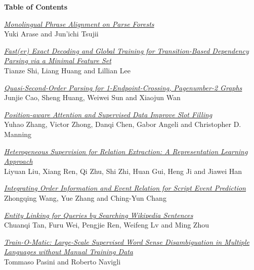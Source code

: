 \setlength{\parindent}{0in}
\setlength{\parskip}{2ex}

\begin{center}
  {\Large \bf Table of Contents}
\end{center}

\vspace*{0.5cm}
\hyperlink{page.1}{\em Monolingual Phrase Alignment on Parse Forests}\samepage \\
\hspace*{7mm} Yuki Arase and Jun'ichi Tsujii\dotfill {}

\hyperlink{page.12}{\em Fast(er) Exact Decoding and Global Training for Transition-Based Dependency Parsing via a Minimal Feature Set}\samepage \\
\hspace*{7mm} Tianze Shi, Liang Huang and Lillian Lee\dotfill {}

\hyperlink{page.24}{\em Quasi-Second-Order Parsing for 1-Endpoint-Crossing, Pagenumber-2 Graphs}\samepage \\
\hspace*{7mm} Junjie Cao, Sheng Huang, Weiwei Sun and Xiaojun Wan\dotfill {}

\hyperlink{page.35}{\em Position-aware Attention and Supervised Data Improve Slot Filling}\samepage \\
\hspace*{7mm} Yuhao Zhang, Victor Zhong, Danqi Chen, Gabor Angeli and Christopher D. Manning\dotfill {}

\hyperlink{page.46}{\em Heterogeneous Supervision for Relation Extraction: A Representation Learning Approach}\samepage \\
\hspace*{7mm} Liyuan Liu, Xiang Ren, Qi Zhu, Shi Zhi, Huan Gui, Heng Ji and Jiawei Han\dotfill {}

\hyperlink{page.57}{\em Integrating Order Information and Event Relation for Script Event Prediction}\samepage \\
\hspace*{7mm} Zhongqing Wang, Yue Zhang and Ching-Yun Chang\dotfill {}

\hyperlink{page.68}{\em Entity Linking for Queries by Searching Wikipedia Sentences}\samepage \\
\hspace*{7mm} Chuanqi Tan, Furu Wei, Pengjie Ren, Weifeng Lv and Ming Zhou\dotfill {}

\hyperlink{page.78}{\em Train-O-Matic: Large-Scale Supervised Word Sense Disambiguation in Multiple Languages without Manual Training Data}\samepage \\
\hspace*{7mm} Tommaso Pasini and Roberto Navigli\dotfill {}

